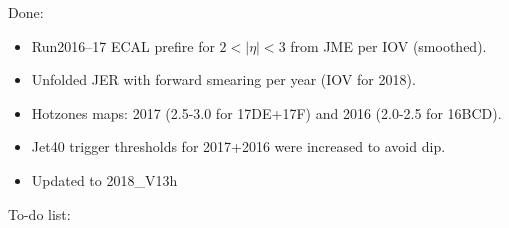\documentclass[landscape,10pt]{beamer} %
\begin{document}
Done:
\begin{itemize}
\item Run2016--17 ECAL prefire for $2<|\eta|<3$ from JME per IOV (smoothed). 
\item Unfolded JER with forward smearing per year (IOV for 2018).
\item Hotzones maps: 2017 (2.5-3.0 for 17DE+17F) and 2016 (2.0-2.5 for 16BCD).
\item Jet40 trigger thresholds for 2017+2016 were increased to avoid dip.
\item Updated to 2018\_V13h
\end{itemize}
To-do list:
\end{document}
